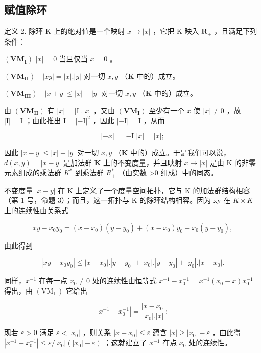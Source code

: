 \subsection{赋值除环}

定义 2. 除环 K 上的绝对值是一个映射 \(x \to |x|\) ，它把 K 映入 \(\mathbf{R}_{+}\) ，且满足下列条件：

\((\mathbf{VM}_{\mathbf{I}})\) \(|x| = 0\) 当且仅当 \(x = 0\) 。

\((\mathbf{VM}_{\mathbf{II}})\quad |xy| = |x|.|y|\) 对一切 \(x,y\) （\(\mathbf{K}\) 中的）成立。

\((\mathbf{VM}_{\mathbf{III}})\quad |x + y|\leqslant |x| + |y|\) 对一切 \(x,y\) （\(\mathbf{K}\) 中的）成立。

由 \((\mathbf{VM}_{\mathbf{II}})\) 有 \(|x| = |\mathrm{I}|.|x|\) ，又由 \((\mathbf{VM}_{\mathbf{I}})\) 至少有一个 \(x\) 使 \(|x| \neq 0\) ，故 \(|\mathrm{I}| = \mathrm{I}\) ；由此推出 \(\mathrm{I} = |- \mathrm{I}|^2\) ，因此 \(|- \mathrm{I}| = \mathrm{I}\) ，从而

\[
| - x | = | - \mathrm{I} | | x | = | x |;
\]

因此 \(|x - y| \leqslant |x| + |y|\) 对一切 \(x, y\) （\(\mathbf{K}\) 中的）成立。于是我们可以说，\(d(x, y) = |x - y|\) 是加法群 \(\mathbf{K}\) 上的不变度量，并且映射 \(x \to |x|\) 是由 K 的非零元素组成的乘法群 \(K^{*}\) 到乘法群 \(R_{+}^{*}\) （由实数 \textgreater0 组成）中的同态。

不变度量 \(|x - y|\) 在 K 上定义了一个度量空间拓扑，它与 K 的加法群结构相容（第 1 号，命题 3）；而且，这一拓扑与 K 的除环结构相容。因为 xy 在 \(K \times K\) 上的连续性由关系式

\[
x y - x _ {0} y _ {0} = (x - x _ {0}) (y - y _ {0}) + (x - x _ {0}) y _ {0} + x _ {0} (y - y _ {0}),
\]

由此得到

\[
\left| x y - x _ {0} y _ {0} \right| \leqslant \left| x - x _ {0} \right|. \left| y - y _ {0} \right| + \left| x _ {0} \right|. \left| y - y _ {0} \right| + \left| y _ {0} \right|. \left| x - x _ {0} \right|.
\]

同样，\(x^{-1}\) 在每一点 \(x_{0} \neq 0\) 处的连续性由恒等式 \(x^{-1} - x_{0}^{-1} = x^{-1} (x_{0} - x)x_{0}^{-1}\) 得出，由 \((\mathrm{VM}_{\mathrm{II}})\) 它给出

\[
\left| x ^ {- 1} - x _ {0} ^ {- 1} \right| = \frac {\left| x - x _ {0} \right|}{\left| x _ {0} \right| . \left| x \right|};
\]

现若 \(\varepsilon > 0\) 满足 \(\varepsilon < |x_0|\) ，则关系 \(|x - x_0| \leqslant \varepsilon\) 蕴含 \(|x| \geqslant |x_0| - \varepsilon\) ，由此得 \(|x^{-1} - x_{0}^{-1}| \leqslant \varepsilon / |x_0| (|x_0| - \varepsilon)\) ；这就建立了 \(x^{-1}\) 在点 \(x_0\) 处的连续性。

